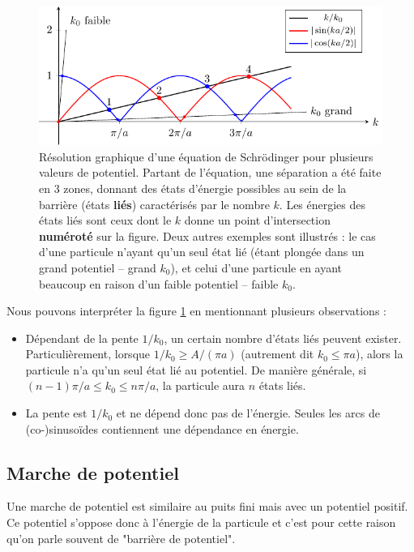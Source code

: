 \documentclass{book}
\begin{document}
\begin{figure}[h]
  \centering
  \includegraphics{images/chap2-puits_fini_solutions.pdf}
  \caption{Résolution graphique d'une équation de Schrödinger pour plusieurs valeurs de potentiel. Partant de l'équation, une séparation a été faite en 3 zones, donnant des états d'énergie possibles au sein de la barrière (états \textbf{liés}) caractérisés par le nombre $k$. Les énergies des états liés sont ceux dont le $k$ donne un point d'intersection \textbf{numéroté} sur la figure. Deux autres exemples sont illustrés : le cas d'une particule n'ayant qu'un seul état lié (étant plongée dans un grand potentiel -- grand $k_0$), et celui d'une particule en ayant beaucoup en raison d'un faible potentiel -- faible $k_0$.}

  \label{fig:chap3-puits_fini_solutions}
\end{figure}

Nous pouvons interpréter la figure \ref{fig:chap3-puits_fini_solutions} en mentionnant plusieurs observations :
\begin{itemize}
  \item  Dépendant de la pente $1/k_0$, un certain nombre d'états liés peuvent exister. Particulièrement, lorsque $1/k_0  \geq A/(\pi a)$ (autrement dit $k_0 \leq \pi a$), alors la particule n'a qu'un seul état lié au potentiel. De manière générale, si $(n-1)\pi/a \leq k_0 \leq n\pi/a$, la particule aura $n$ états liés.
  \item La pente est $1/k_0$ et ne dépend donc pas de l'énergie. Seules les arcs de (co-)sinusoïdes contiennent une dépendance en énergie.
\end{itemize}



\subsection{Marche de potentiel}
Une marche de potentiel est similaire au puits fini mais avec un potentiel positif. Ce potentiel s'oppose donc à l'énergie de la particule et c'est pour cette raison qu'on parle souvent de "barrière de potentiel".
\end{document}
